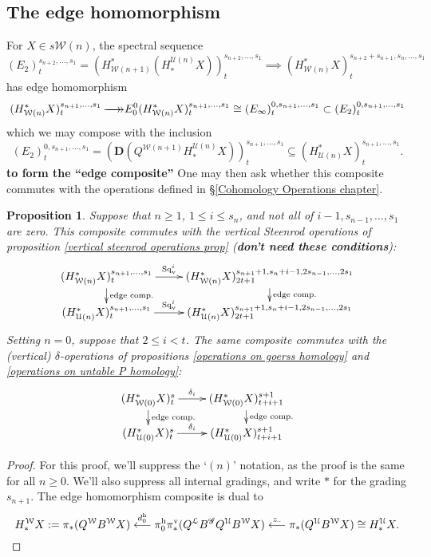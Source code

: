 \documentclass[11pt]{amsart}
\theoremstyle{plain}
\newtheorem{prop}[thm]{Proposition}
\theoremstyle{definition}
\newcommand{\DASH}{\textup{--}}
\renewcommand{\to}{\longrightarrow}
\newcommand{\from}{\longleftarrow}
\newcommand{\scrG}{\mathscr{G}}
\newcommand{\calW}{\mathcal{W}}
\newcommand{\calU}{\mathcal{U}}
\newcommand{\calL}{\mathcal{L}}
\theoremstyle{plain}
\newcommand{\BSW}{{\scrG}}
\newcommand{\epi}{{\,\makebox[0cm][l]{\ensuremath\to}\to}}
\newcommand{\Sqv}{\mathrm{Sq}_\textup{v}}
\newcommand{\dual}{\mathbf{D}}
\begin{document}
\begin{Composite functor spectral sequences}
\subsection{The edge homomorphism}
For $X\in s\calW(n)$, the spectral sequence
\[(E_2)^{s_{n+2},\ldots,s_1}_t=(H^*_{\calW(n+1)}(H_*^{\calU(n)}X))^{s_{n+2},\ldots,s_1}_t\implies (H^*_{\calW(n)}X)^{s_{n+2}+s_{n+1},s_n,\ldots,s_1}_t\]
has edge homomorphism
\[(H^*_{\calW(n)}X)^{s_{n+1},\ldots,s_{1}}_t\epi
E_0^{0}(H^*_{\calW(n)}X)^{s_{n+1},\ldots,s_{1}}_t\cong (E_\infty)^{0,s_{n+1},\ldots,s_1}_t\subset (E_2)^{0,s_{n+1},\ldots,s_1}_t\]
which we may compose with the inclusion
\[(E_2)^{0,s_{n+1},\ldots,s_1}_t=(\dual(Q^{\calW(n+1)}H_*^{\calU(n)}X))^{s_{n+1},\ldots,s_1}_t\subseteq (H^*_{\calU(n)}X)^{s_{n+1},\ldots,s_1}_t.\]
\textbf{to form the ``edge composite''}
One may then ask whether this composite commutes with the operations defined in \S\ref{Cohomology Operations chapter}.
\begin{prop}\label{edgehomproposition}
Suppose that $n\geq1$, $1\leq i \leq s_n$, and not all of $i-1,s_{n-1},\ldots,s_1$ are zero. This composite commutes with the vertical Steenrod operations of proposition \ref{vertical steenrod operations prop} (\textbf{don't need these conditions}):
\[\xymatrix@R=4mm{
(H^*_{\calW(n)}X)^{s_{n+1},\ldots,s_1}_t\ar[r]^-{\Sqv^i}
\ar[d]^-{\textup{edge comp.}}
&%
(H^*_{\calW(n)}X)^{s_{n+1}+1,s_n+i-1,2s_{n-1},\ldots,2s_1}_{2t+1}\ar[d]^-{\textup{edge comp.}}
\\%
(H^*_{\calU(n)}X)^{s_{n+1},\ldots,s_1}_t\ar[r]^-{\Sqv^i}
&%
(H^*_{\calU(n)}X)^{s_{n+1}+1,s_n+i-1,2s_{n-1},\ldots,2s_1}_{2t+1}
}\]
Setting $n=0$, suppose that $2\leq i <t$. The same composite commutes with the (vertical) $\delta$-operations of propositions \ref{operations on goerss homology} and \ref{operations on untable P homology}:
\[\xymatrix@R=4mm{
(H^*_{\calW(0)}X)^{s}_t\ar[r]^-{\delta_i}
\ar[d]^-{\textup{edge comp.}}
&%
(H^*_{\calW(0)}X)^{s+1}_{t+i+1}\ar[d]^-{\textup{edge comp.}}
\\%
(H^*_{\calU(0)}X)^{s}_t\ar[r]^-{\delta_i}
&%
(H^*_{\calU(0)}X)^{s+1}_{t+i+1}
}\]
\end{prop}
\begin{proof}For this proof, we'll suppress the `$(n)$' notation, as the proof is the same for all $n\geq0$. We'll also suppress all internal gradings, and write $*$ for the grading $s_{n+1}$. The edge homomorphism composite is dual to
\[H_*^{\calW}X:=\pi_*(Q^{\calW}B^{\calW}X)\overset{d_0^\textup{h}}{\from}\pi_0^\textup{h}\pi_*^\textup{v}(Q^{\calL}B^{\BSW} Q^{\calU}B^{\calW}X)\overset{z_{\DASH}}{\from}\pi_*(Q^{\calU}B^{\calW}X)\cong H_*^{\calU}X.\]

\end{proof}
\end{Composite functor spectral sequences}
\end{document}
